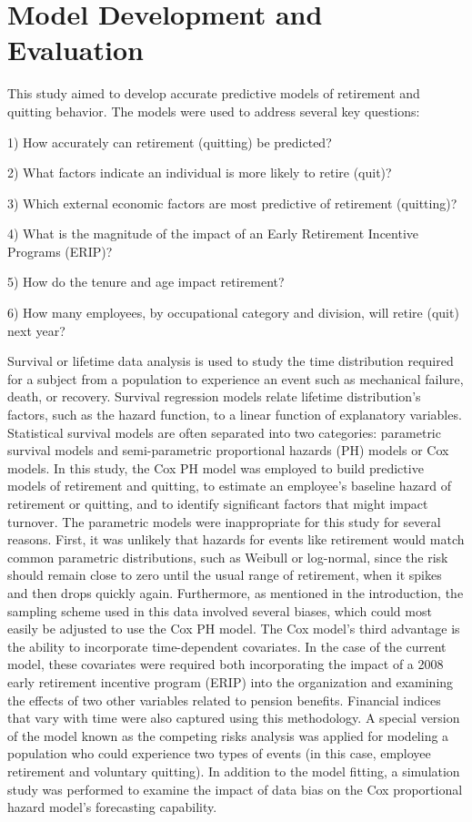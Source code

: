 \section{Model Development and Evaluation}
This study aimed to develop accurate predictive models of retirement and quitting behavior. The models were used to address several key questions: 

1) How accurately can retirement (quitting) be predicted? 

2) What factors indicate an individual is more likely to retire (quit)? 

3) Which external economic factors are most predictive of retirement (quitting)?

4) What is the magnitude of the impact of an Early Retirement Incentive Programs (ERIP)?

5) How do the tenure and age impact retirement?

6) How many employees, by occupational category and division, will retire (quit) next year?

Survival or lifetime data analysis is used to study the time distribution required for a subject from a population to experience an event such as mechanical failure, death, or recovery. Survival regression models relate lifetime distribution's factors, such as the hazard function, to a linear function of explanatory variables. Statistical survival models are often separated into two categories: parametric survival models and semi-parametric proportional hazards (PH) models or Cox models.  In this study, the Cox PH model was employed to build predictive models of retirement and quitting, to estimate an employee's baseline hazard of retirement or quitting, and to identify significant factors that might impact turnover. The parametric models were inappropriate for this study for several reasons. First, it was unlikely that hazards for events like retirement would match common parametric distributions, such as Weibull or log-normal, since the risk should remain close to zero until the usual range of retirement,  when it spikes and then drops quickly again. Furthermore, as mentioned in the introduction, the sampling scheme used in this data involved several biases, which could most easily be adjusted to use the Cox PH model. The Cox model's third advantage is the ability to incorporate time-dependent covariates.    In the case of the current model, these covariates were required both incorporating the impact of a 2008 early retirement incentive program (ERIP) into the organization and examining the effects of two other variables related to pension benefits. Financial indices that vary with time were also captured using this methodology. A special version of the model known as the competing risks analysis was applied for modeling a population who could experience two types of events (in this case, employee retirement and voluntary quitting). In addition to the model fitting, a simulation study was performed to examine the impact of data bias on the Cox proportional hazard model's forecasting capability.
